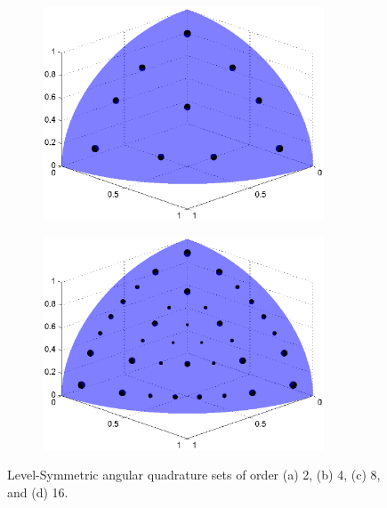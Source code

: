 \begin{figure}
\begin{subfigure}[b]{0.48\textwidth}
		\caption{}
	\end{subfigure}
	\vfill
	\begin{subfigure}[b]{0.48\textwidth}
		\centering
		\includegraphics[width=0.92\textwidth]{figures/sec_Sn/LS8_3D.eps}
		\caption{}
	\end{subfigure}
	\hfill
	\begin{subfigure}[b]{0.48\textwidth}
		\centering
		\includegraphics[width=0.92\textwidth]{figures/sec_Sn/LS16_3D.eps}
		\caption{}
	\end{subfigure}
\caption{Level-Symmetric angular quadrature sets of order (a) 2, (b) 4, (c) 8, and (d) 16.}
\label{fig::Sn_Angle_LS_Quads_3D}
\end{figure}

